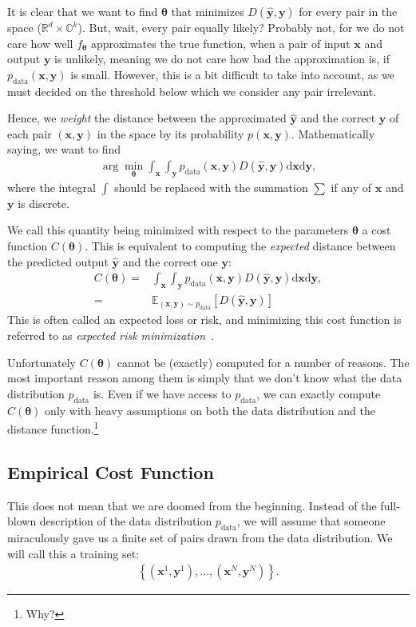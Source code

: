 \documentclass{report}
\newcommand{\vect}[1]{\mathbf{#1}}
\newcommand{\vects}[1]{\boldsymbol{#1}}
\newcommand{\vx}[0]{\vect{x}}
\newcommand{\vy}[0]{\vect{y}}
\newcommand{\TT}[0]{\vects{\theta}}
\newcommand{\RR}[0]{\mathbb{R}}
\newcommand{\OO}[0]{\mathbb{O}}
\newcommand{\E}[0]{\mathbb{E}}
\newcommand{\dd}[1]{\ensuremath{\mbox{d}#1}}
\begin{document}
It is clear that we want to find $\TT$ that minimizes $D(\hat{\vy}, \vy)$ for
every pair in the space ($\RR^d \times \OO^k$). But, wait, every pair equally
likely? Probably not, for we do not care how well $f_{\TT}$ approximates the
true function, when a pair of input $\vx$ and output $\vy$ is unlikely, meaning
we do not care how bad the approximation is, if $p_\text{data}(\vx, \vy)$ is
small. However, this is a bit difficult to take into account, as we must decided
on the threshold below which we consider any pair irrelevant.

Hence, we {\em weight} the distance between the approximated $\hat{\vy}$ and the
correct $\vy$ of each pair $(\vx, \vy)$ in the space by its probability $p(\vx,
\vy)$. Mathematically saying, we want to find 
\begin{align*}
    \arg\min_{\TT} \int_{\vx} \int_{\vy} p_{\text{data}}(\vx, \vy) D(\hat{\vy}, \vy) \dd{\vx}
    \dd{\vy},
\end{align*}
where the integral $\int$ should be replaced with the summation $\sum$ if any of
$\vx$ and $\vy$ is discrete.

We call this quantity being minimized with respect to the parameters $\TT$ a
cost function $C(\TT)$. This is equivalent to computing the {\em expected}
distance between the predicted output $\hat{\vy}$ and the correct one $\vy$:
\begin{align}
    \label{eq:expected_cost}
    C(\TT) =& \int_{\vx} \int_{\vy} p_{\text{data}}(\vx, \vy) D(\hat{\vy}, \vy) \dd{\vx}
    \dd{\vy}, \\
    =& \E_{(\vx,\vy) \sim p_{\text{data}}}\left[ D(\hat{\vy}, \vy) \right] 
\end{align}
This is often called an expected loss or risk, and minimizing this cost function
is referred to as {\em expected risk minimization}~\cite{Vapnik1995}.

Unfortunately $C(\TT)$ cannot be (exactly) computed for a number of reasons. The
most important reason among them is simply that we don't know what the data
distribution $p_{\text{data}}$ is. Even if we have access to $p_{\text{data}}$,
we can exactly compute $C(\TT)$ only with heavy assumptions on both the data
distribution and the distance function.\footnote{Why?} 

\subsection{Empirical Cost Function}

This does not mean that we are doomed from the beginning. Instead of the
full-blown description of the data distribution $p_{\text{data}}$, we will
assume that someone miraculously gave us a finite set of pairs drawn from the
data distribution. We will call this a training set:
\begin{align*}
    \left\{ (\vx^1, \vy^1), \ldots, (\vx^N, \vy^N) \right\}.  
\end{align*}
\end{document}
